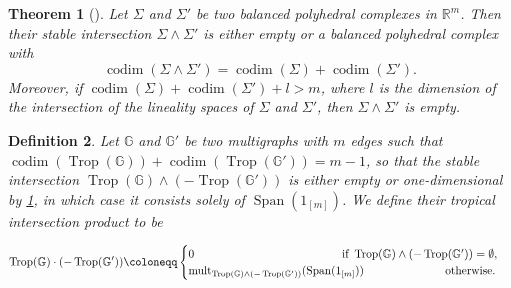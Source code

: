 \documentclass[11pt,reqno,a4paper]{amsart}
\theoremstyle{theoremstyle}
\newtheorem{theorem}{Theorem}[section]
\theoremstyle{examplestyle}
\newtheorem{definition}[theorem]{Definition}
\theoremstyle{algorithmstyle}
\newcommand{\GG}{\mathbb{G}}
\newcommand{\RR}{\mathbb{R}}
\DeclareMathOperator{\codim}{codim}
\DeclareMathOperator{\mult}{mult}
\DeclareMathOperator{\Span}{Span}
\DeclareMathOperator{\Trop}{Trop}
\newcommand{\forGlasgow}[1]{}
\newcommand{\forArXiv}[1]{#1}
\begin{document}

\begin{theorem}[{\cite[Theorem 3.6.10]{MaclaganSturmfels2015}}]
  \label{thm:stableIntersection}
  Let $\Sigma$ and $\Sigma'$ be two balanced polyhedral complexes in $\RR^m$. Then their stable intersection $\Sigma\wedge\Sigma'$ is either empty or a balanced polyhedral complex with
  \begin{equation*}
    \codim(\Sigma\wedge\Sigma') = \codim(\Sigma)+\codim(\Sigma').
  \end{equation*}
  Moreover, if $\codim(\Sigma)+\codim(\Sigma')+l>m$, where $l$ is the dimension of the intersection of the lineality spaces of $\Sigma$ and $\Sigma'$, then $\Sigma\wedge\Sigma'$ is empty.
\end{theorem}

\begin{definition}
  \label{def:tropicalIntersectionProduct}
  Let $\GG$ and $\GG'$ be two multigraphs with $m$ edges such that $\codim(\Trop(\GG))+\codim(\Trop(\GG'))=m-1$, so that the stable intersection $\Trop(\GG)\wedge (-\Trop(\GG'))$ is either empty or one-dimensional by \cref{thm:stableIntersection}, in which case it consists solely of $\Span(1_{[m]})$.  We define their \emph{tropical intersection product} to be
  \forGlasgow
    {
    \begin{equation*}
       \Trop(\GG)\cdot (-\Trop(\GG')) \coloneqq 
    \begin{cases}
            0 & \text{if } \Trop(\GG)\wedge (-\Trop(\GG'))=\emptyset,\\
           \mult_{\Trop(\GG)\wedge (-\Trop(\GG'))}(\Span(1_{[m]})) &\text{otherwise}.
       \end{cases}
    \end{equation*}
    }
  \forArXiv
  {
  \begin{equation*} %
     \Trop(\GG)\cdot (-\Trop(\GG')) \coloneqq 
     \begin{cases}
         0 \hspace{45.5mm} \text{if } \Trop(\GG)\wedge (-\Trop(\GG'))=\emptyset,\\
         \mult_{\Trop(\GG)\wedge (-\Trop(\GG'))}(\Span(1_{[m]})) \hspace{25mm} \text{otherwise}.
     \end{cases}
  \end{equation*}
  }
\end{definition}
\end{document}
